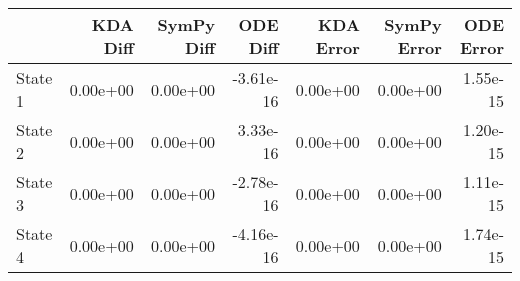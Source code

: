 \begin{tabular}{lrrrrrr}
\toprule
{} &  KDA Diff &  SymPy Diff &  ODE Diff &  KDA Error &  SymPy Error &  ODE Error \\
\midrule
State 1 &  0.00e+00 &    0.00e+00 & -3.61e-16 &   0.00e+00 &     0.00e+00 &   1.55e-15 \\
State 2 &  0.00e+00 &    0.00e+00 &  3.33e-16 &   0.00e+00 &     0.00e+00 &   1.20e-15 \\
State 3 &  0.00e+00 &    0.00e+00 & -2.78e-16 &   0.00e+00 &     0.00e+00 &   1.11e-15 \\
State 4 &  0.00e+00 &    0.00e+00 & -4.16e-16 &   0.00e+00 &     0.00e+00 &   1.74e-15 \\
\bottomrule
\end{tabular}
